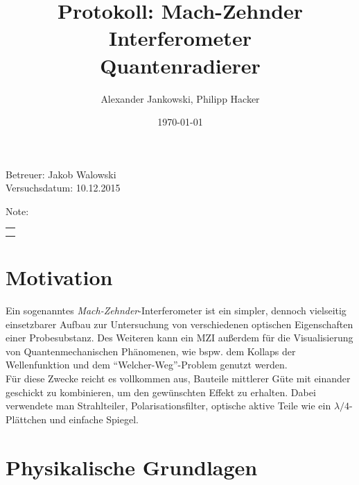 \documentclass[numbers=noenddot,a4paper,notitlepage,twoside,BCOR15mm]{scrartcl}
\title{Protokoll: Mach-Zehnder Interferometer\\Quantenradierer} %
\author{Alexander Jankowski, Philipp Hacker}
\date{\today}
\newcommand{\tilt}[1]{\textit{#1}}
\begin{document}
	\maketitle
	\begin{center}
		Betreuer: Jakob Walowski\\ %
		Versuchsdatum: 10.12.2015\\ %
		\begin{table}[h]
			\centering
			Note: %
			\begin{tabularx}{1.5cm}{|X|}
				\hline \\ \\
				\hline
			\end{tabularx}
		\end{table}
	\end{center}
	\vspace*{\fill}
	\tableofcontents
	\vfill
	\clearpage
	\section{Motivation}

		Ein sogenanntes \tilt{Mach-Zehnder}-Interferometer ist ein simpler, dennoch vielseitig einsetzbarer Aufbau zur Untersuchung von verschiedenen optischen Eigenschaften einer Probesubstanz. Des Weiteren kann ein MZI außerdem für die Visualisierung von Quantenmechanischen Phänomenen, wie bspw. dem Kollaps der Wellenfunktion und dem "`Welcher-Weg"'-Problem genutzt werden.\\
		Für diese Zwecke reicht es vollkommen aus, Bauteile mittlerer Güte mit einander geschickt zu kombinieren, um den gewünschten Effekt zu erhalten. Dabei verwendete man Strahlteiler, Polarisationsfilter, optische aktive Teile wie ein $\lambda/4$-Plättchen und einfache Spiegel.
	\clearpage
	\section{Physikalische Grundlagen}
\end{document}
